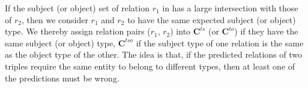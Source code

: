 If the subject (or object) set of relation $r_1$ in \KB has a large intersection with those of $r_2$, then we consider $r_1$ and $r_2$ to have the same expected subject (or object) type.
We thereby assign relation pairs ($r_1$, $r_2$) into $\bm{C}^{ts}$ (or $\bm{C}^{to}$) if they have the same subject (or object) type,
$\bm{C}^{tso}$  if the subject type of one relation is the same as the object type of the other.
The idea is that, if the predicted relations of two triples require the same entity to belong to different types, then at least one of the predictions must be wrong.

